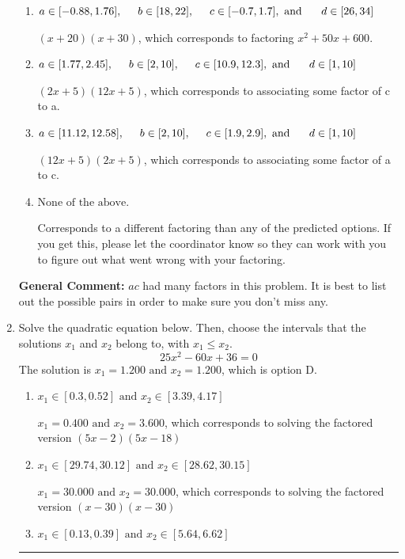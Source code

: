 \documentclass{extbook}[14pt]
\newcommand{\litem}[1]{\item #1

\rule{\textwidth}{0.4pt}}
\begin{document}
\begin{enumerate}
{\begin{enumerate}[label=\Alph*.]
* $(6x + 5)(4x + 5)$, which is the correct option.
\item \( a \in [-0.88, 1.76], \hspace*{5mm} b \in [18, 22], \hspace*{5mm} c \in [-0.7, 1.7], \text{ and } \hspace*{5mm} d \in [26, 34] \)

 $(x + 20)(x + 30)$, which corresponds to factoring $x^{2} +50 x + 600$.
\item \( a \in [1.77, 2.45], \hspace*{5mm} b \in [2, 10], \hspace*{5mm} c \in [10.9, 12.3], \text{ and } \hspace*{5mm} d \in [1, 10] \)

 $(2x + 5)(12x + 5)$, which corresponds to associating some factor of c to a.
\item \( a \in [11.12, 12.58], \hspace*{5mm} b \in [2, 10], \hspace*{5mm} c \in [1.9, 2.9], \text{ and } \hspace*{5mm} d \in [1, 10] \)

 $(12x + 5)(2x + 5)$, which corresponds to associating some factor of a to c.
\item \( \text{None of the above.} \)

 Corresponds to a different factoring than any of the predicted options. If you get this, please let the coordinator know so they can work with you to figure out what went wrong with your factoring.
\end{enumerate}

\textbf{General Comment:} $ac$ had many factors in this problem. It is best to list out the possible pairs in order to make sure you don't miss any.
}
\litem{
Solve the quadratic equation below. Then, choose the intervals that the solutions $x_1$ and $x_2$ belong to, with $x_1 \leq x_2$.
\[ 25x^{2} -60 x + 36 = 0 \]The solution is \( x_1 = 1.200 \text{ and } x_2 = 1.200 \), which is option D.\begin{enumerate}[label=\Alph*.]
\item \( x_1 \in [0.3, 0.52] \text{ and } x_2 \in [3.39, 4.17] \)

$x_1 = 0.400 \text{ and } x_2 = 3.600$, which corresponds to solving the factored version $(5x -2)(5x -18)$
\item \( x_1 \in [29.74, 30.12] \text{ and } x_2 \in [28.62, 30.15] \)

$x_1 = 30.000 \text{ and } x_2 = 30.000$, which corresponds to solving the factored version $(x -30)(x -30)$
\item \( x_1 \in [0.13, 0.39] \text{ and } x_2 \in [5.64, 6.62] \)


\end{enumerate}}
\end{enumerate}
\end{document}
